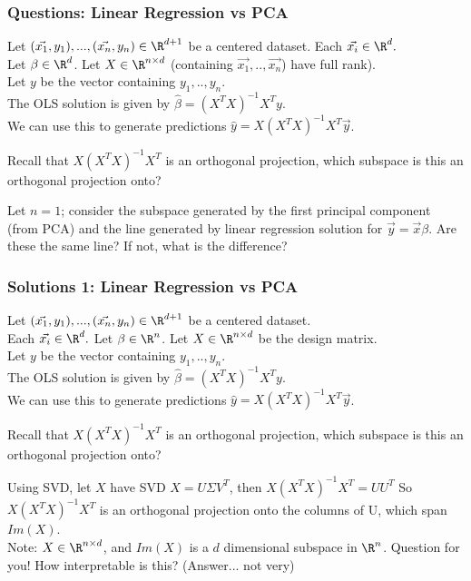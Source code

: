 \documentclass{beamer}
\renewenvironment{enumerate}%
{\begin{list}{\arabic{enumi}.}%
      {\setlength{\leftmargin}{2.5em}%
       \setlength{\itemsep}{-\parsep}%
       \setlength{\topsep}{-\parskip}%
       \usecounter{enumi}}%
 }{\end{list}}
\begin{document}
\begin{frame}
\frametitle{Questions: Linear Regression vs PCA}
Let $(\vec{x_1},y_1),...,(\vec{x_n},y_n) \in \R^{d+1}$ be a centered dataset. Each $\vec{x_i}\in\R^d.$\\
Let $\beta \in \R^d$. Let $X\in\R^{n\times d}$ (containing $\vec{x_1},..,\vec{x_n}$) have full rank).\\
Let $y$ be the vector containing $y_1,..,y_n$.\\
The OLS solution is given by $\hat{\beta} = (X^TX)^{-1}X^Ty$.  \\
We can use this to generate predictions $\hat{y} = X(X^TX)^{-1}X^T\vec{y}$.\\

\begin{enumerate}
\item Recall that $X(X^TX)^{-1}X^T$ is an orthogonal projection, which subspace is this an orthogonal projection onto? 
\medskip
\item Let $n = 1$; consider the subspace generated by the first principal component (from PCA) and the line generated by linear regression solution for $\vec{y}=\vec{x}\beta$.
Are these the same line? If not, what is the difference?
\end{enumerate}
\end{frame}

\begin{frame}
\frametitle{Solutions 1: Linear Regression vs PCA}
Let $(\vec{x_1},y_1),...,(\vec{x_n},y_n) \in \R^{d+1}$ be a centered dataset.\\
Each $\vec{x_i}\in\R^d.$ Let $\beta \in \R^n$. Let $X\in\R^{n\times d}$ be the design matrix.\\
Let $y$ be the vector containing $y_1,..,y_n$.\\
The OLS solution is given by $\hat{\beta} = (X^TX)^{-1}X^Ty$.  \\
We can use this to generate predictions $\hat{y} = X(X^TX)^{-1}X^T\vec{y}$.\\

\begin{enumerate}
\item Recall that $X(X^TX)^{-1}X^T$ is an orthogonal projection, which subspace is this an orthogonal projection onto? 
\begin{solution}
Using SVD, let $X$ have SVD $X = U \Sigma V^T$, then
\quad $X(X^TX)^{-1}X^T = U U^T$
So $X(X^TX)^{-1}X^T$ is an orthogonal projection onto the columns of U, which span $Im(X)$. \\
Note: $X\in \R^{n\times d}$, and  $Im(X)$ is a $d$ dimensional subspace in $\R^n$.
Question for you! How interpretable is this? (Answer... not very)
\end{solution}

\end{enumerate}
\end{frame}
\end{document}
